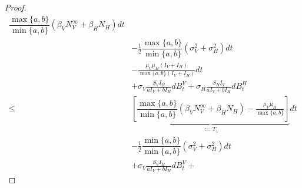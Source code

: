 \begin{proof}
\begin{equation}
\begin{aligned}
            \dfrac{
                \max\{
                    a, b
                \}
            }{
                \min\{
                    a, b
                \}
            }
            \left (
                 \beta_{V} N_V ^ \infty
                +
                \beta_H N_H
            \right ) dt
            \\
            & 
            -
            \frac{1}{2}
            \dfrac{
                \max\{
                    a, b
                \}
            }{
                \min\{
                    a, b
                \}
            }
            \left(
                \sigma_V ^ 2
                +
                \sigma_H ^ 2
            \right) dt
            \\
            &
            -
            \frac{
                \mu_V \mu_H (I_V + I_H)
            }{\max \{a, b\} (I_V + I_H)}
            dt
            \\
            & +
            \sigma_V 
            \frac{S_V I_H}{a I_V + b I_H}
            d B_t ^ V
            +
            \sigma_H
            \frac{S_H I_V}{a I_V + b I_H}
            d B_t ^ H
            \\
            \leq &
                \underbrace{
                    \left[
                        \dfrac{
                            \max\{a, b\}
                        }{
                            \min\{a, b\}
                        }
                        \left (
                             \beta_V N_V ^ \infty
                            +
                            \beta_H N_H
                        \right )
                        -
                        \frac{
                            \mu_V \mu_H 
                        }{
                            \max \{a, b\} 
                        }
                     \right]
                }_{:= T_1}
                 dt
            \\
            &
            -
            \frac{1}{2}
                \dfrac{
                    \min\{
                        a, b
                    \}
                }{
                    \min\{
                        a, b
                    \}
                }
            \left (
                \sigma_V ^ 2
                +
                \sigma_H ^ 2
            \right ) dt
            \\
            & +
            \sigma_V 
            \frac{S_V I_H}{a I_V + b I_H}
            d B_t ^ V
            +

\end{aligned}
\end{equation}
\end{proof}
